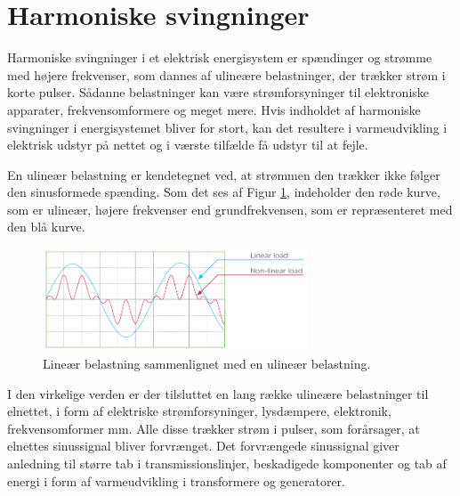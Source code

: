 
\section{Harmoniske svingninger}
\label{sec:THD}
Harmoniske svingninger i et elektrisk energisystem er spændinger og strømme med højere frekvenser, som dannes af ulineære belastninger, der trækker strøm i korte pulser. Sådanne belastninger kan være strømforsyninger til elektroniske apparater, frekvensomformere og meget mere. Hvis indholdet af harmoniske svingninger i energisystemet bliver for stort, kan det resultere i varmeudvikling i elektrisk udstyr på nettet og i værste tilfælde få udstyr til at fejle. \newline

En ulineær belastning er kendetegnet ved, at strømmen den trækker ikke følger den sinusformede spænding.  Som det ses af Figur \ref{fig:nonLinear}, indeholder den røde kurve, som er ulineær, højere frekvenser end grundfrekvensen, som er repræsenteret med den blå kurve. 


\begin{figure}[H] %
	\centering
	\includegraphics[width=0.7\textwidth]{figure/nonLinear}
	\caption{Lineær belastning sammenlignet med en ulineær belastning.}
	\label{fig:nonLinear}
\end{figure}

I den virkelige verden er der tilsluttet en lang række ulineære belastninger til elnettet, i form af elektriske strømforsyninger, lysdæmpere, elektronik, frekvensomformer mm. Alle disse trækker strøm i pulser, som forårsager, at elnettes sinussignal bliver forvrænget. Det forvrængede sinussignal giver anledning til større tab i transmissionslinjer, beskadigede komponenter og tab af energi i form af varmeudvikling i transformere og generatorer. \newline

